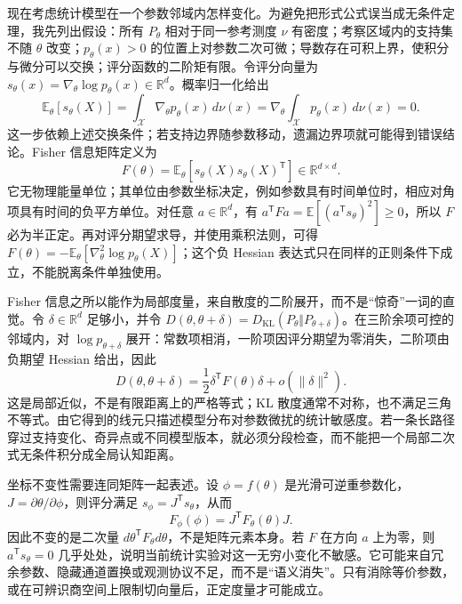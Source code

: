 现在考虑统计模型在一个参数邻域内怎样变化。为避免把形式公式误当成无条件定理，我先列出假设：所有 $P_\theta$ 相对于同一参考测度 $\nu$ 有密度；考察区域内的支持集不随 $\theta$ 改变；$p_\theta(x)>0$ 的位置上对参数二次可微；导数存在可积上界，使积分与微分可以交换；评分函数的二阶矩有限。令评分向量为 $s_\theta(x)=\nabla_\theta\log p_\theta(x)\in\mathbb R^d$。概率归一化给出
\begin{equation}
    \mathbb E_\theta[s_\theta(X)]
    =\int_{\mathcal X}\nabla_\theta p_\theta(x)\,d\nu(x)
    =\nabla_\theta\int_{\mathcal X}p_\theta(x)\,d\nu(x)=0.
\end{equation}
这一步依赖上述交换条件；若支持边界随参数移动，遗漏边界项就可能得到错误结论。Fisher 信息矩阵定义为
\begin{equation}
    F(\theta)=\mathbb E_\theta[s_\theta(X)s_\theta(X)^{\mathsf T}]\in\mathbb R^{d\times d}.
\end{equation}
它无物理能量单位；其单位由参数坐标决定，例如参数具有时间单位时，相应对角项具有时间的负平方单位。对任意 $a\in\mathbb R^d$，有 $a^{\mathsf T}Fa=\mathbb E[(a^{\mathsf T}s_\theta)^2]\geq0$，所以 $F$ 必为半正定。再对评分期望求导，并使用乘积法则，可得 $F(\theta)=-\mathbb E_\theta[\nabla^2_\theta\log p_\theta(X)]$；这个负 Hessian 表达式只在同样的正则条件下成立，不能脱离条件单独使用。

Fisher 信息之所以能作为局部度量，来自散度的二阶展开，而不是“惊奇”一词的直觉。令 $\delta\in\mathbb R^d$ 足够小，并令 $D(\theta,\theta+\delta)=D_{\mathrm{KL}}(P_\theta\Vert P_{\theta+\delta})$。在三阶余项可控的邻域内，对 $\log p_{\theta+\delta}$ 展开：常数项相消，一阶项因评分期望为零消失，二阶项由负期望 Hessian 给出，因此
\begin{equation}
    D(\theta,\theta+\delta)
    =\frac12\delta^{\mathsf T}F(\theta)\delta+o(\lVert\delta\rVert^2).
\end{equation}
这是局部近似，不是有限距离上的严格等式；KL 散度通常不对称，也不满足三角不等式。由它得到的线元只描述模型分布对参数微扰的统计敏感度。若一条长路径穿过支持变化、奇异点或不同模型版本，就必须分段检查，而不能把一个局部二次式无条件积分成全局认知距离。

坐标不变性需要连同矩阵一起表述。设 $\phi=f(\theta)$ 是光滑可逆重参数化，$J=\partial\theta/\partial\phi$，则评分满足 $s_\phi=J^{\mathsf T}s_\theta$，从而
\begin{equation}
    F_\phi(\phi)=J^{\mathsf T}F_\theta(\theta)J.
\end{equation}
因此不变的是二次量 $d\theta^{\mathsf T}F_\theta d\theta$，不是矩阵元素本身。若 $F$ 在方向 $a$ 上为零，则 $a^{\mathsf T}s_\theta=0$ 几乎处处，说明当前统计实验对这一无穷小变化不敏感。它可能来自冗余参数、隐藏通道置换或观测协议不足，而不是“语义消失”。只有消除等价参数，或在可辨识商空间上限制切向量后，正定度量才可能成立。

